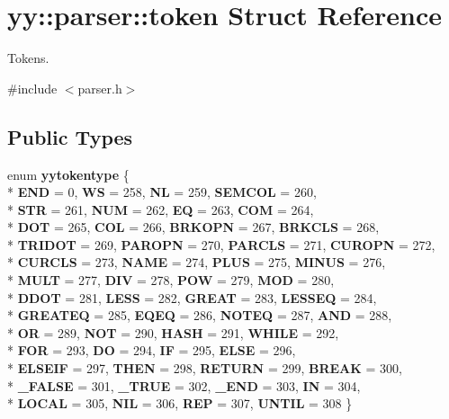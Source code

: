 \hypertarget{structyy_1_1parser_1_1token}{}\section{yy\+:\+:parser\+:\+:token Struct Reference}
\label{structyy_1_1parser_1_1token}


Tokens.  




{\ttfamily \#include $<$parser.\+h$>$}

\subsection*{Public Types}
\begin{DoxyCompactItemize}
\item 
\hypertarget{structyy_1_1parser_1_1token_a90b63e7f9dd7177dd3bf01c58c408475}{}enum {\bfseries yytokentype} \{ \\*
{\bfseries E\+N\+D} = 0, 
{\bfseries W\+S} = 258, 
{\bfseries N\+L} = 259, 
{\bfseries S\+E\+M\+C\+O\+L} = 260, 
\\*
{\bfseries S\+T\+R} = 261, 
{\bfseries N\+U\+M} = 262, 
{\bfseries E\+Q} = 263, 
{\bfseries C\+O\+M} = 264, 
\\*
{\bfseries D\+O\+T} = 265, 
{\bfseries C\+O\+L} = 266, 
{\bfseries B\+R\+K\+O\+P\+N} = 267, 
{\bfseries B\+R\+K\+C\+L\+S} = 268, 
\\*
{\bfseries T\+R\+I\+D\+O\+T} = 269, 
{\bfseries P\+A\+R\+O\+P\+N} = 270, 
{\bfseries P\+A\+R\+C\+L\+S} = 271, 
{\bfseries C\+U\+R\+O\+P\+N} = 272, 
\\*
{\bfseries C\+U\+R\+C\+L\+S} = 273, 
{\bfseries N\+A\+M\+E} = 274, 
{\bfseries P\+L\+U\+S} = 275, 
{\bfseries M\+I\+N\+U\+S} = 276, 
\\*
{\bfseries M\+U\+L\+T} = 277, 
{\bfseries D\+I\+V} = 278, 
{\bfseries P\+O\+W} = 279, 
{\bfseries M\+O\+D} = 280, 
\\*
{\bfseries D\+D\+O\+T} = 281, 
{\bfseries L\+E\+S\+S} = 282, 
{\bfseries G\+R\+E\+A\+T} = 283, 
{\bfseries L\+E\+S\+S\+E\+Q} = 284, 
\\*
{\bfseries G\+R\+E\+A\+T\+E\+Q} = 285, 
{\bfseries E\+Q\+E\+Q} = 286, 
{\bfseries N\+O\+T\+E\+Q} = 287, 
{\bfseries A\+N\+D} = 288, 
\\*
{\bfseries O\+R} = 289, 
{\bfseries N\+O\+T} = 290, 
{\bfseries H\+A\+S\+H} = 291, 
{\bfseries W\+H\+I\+L\+E} = 292, 
\\*
{\bfseries F\+O\+R} = 293, 
{\bfseries D\+O} = 294, 
{\bfseries I\+F} = 295, 
{\bfseries E\+L\+S\+E} = 296, 
\\*
{\bfseries E\+L\+S\+E\+I\+F} = 297, 
{\bfseries T\+H\+E\+N} = 298, 
{\bfseries R\+E\+T\+U\+R\+N} = 299, 
{\bfseries B\+R\+E\+A\+K} = 300, 
\\*
{\bfseries \+\_\+\+F\+A\+L\+S\+E} = 301, 
{\bfseries \+\_\+\+T\+R\+U\+E} = 302, 
{\bfseries \+\_\+\+E\+N\+D} = 303, 
{\bfseries I\+N} = 304, 
\\*
{\bfseries L\+O\+C\+A\+L} = 305, 
{\bfseries N\+I\+L} = 306, 
{\bfseries R\+E\+P} = 307, 
{\bfseries U\+N\+T\+I\+L} = 308
 \}\label{structyy_1_1parser_1_1token_a90b63e7f9dd7177dd3bf01c58c408475}


\end{DoxyCompactItemize}
